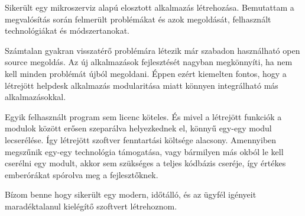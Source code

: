 Sikerült egy mikroszerviz alapú elosztott alkalmazás létrehozása. Bemutattam a megvalósítás során felmerült problémákat és azok megoldását, felhasznált technológiákat és módszertanokat.


Számtalan gyakran visszatérő problémára létezik már szabadon használható open source megoldás. Az új alkalmazások fejlesztését nagyban megkönnyíti, ha nem kell minden problémát újból megoldani. Éppen ezért kiemelten fontos, hogy a létrejött helpdesk alkalmazás modularitása miatt könnyen integrálható más alkalmazásokkal.


Egyik felhasznált program sem licenc köteles. És mivel a létrejött funkciók a modulok között erősen szeparálva helyezkednek el, könnyű egy-egy modul lecserélése. Így  létrejött szoftver fenntartási költsége alacsony. Amennyiben megszűnik egy-egy technológia támogatása, vagy bármilyen más okból le kell cserélni egy modult, akkor sem szükséges a teljes kódbázis cseréje, így értékes emberórákat spórolva meg a fejlesztőknek.

\bigskip
\bigskip

Bízom benne hogy sikerült egy modern, időtálló, és az ügyfél igényeit maradéktalanul kielégítő szoftvert létrehoznom.